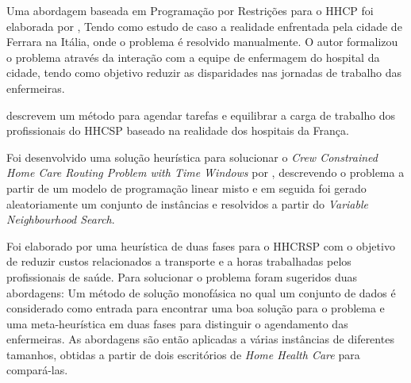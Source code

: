 Uma abordagem baseada em Programação por Restrições para o \ac{HHCP} foi elaborada por \cite{cattafi:2012}, Tendo como estudo de caso a realidade enfrentada pela cidade de Ferrara na Itália, onde o problema é resolvido manualmente. O autor formalizou o problema através da interação com a equipe de enfermagem do hospital da cidade, tendo como objetivo reduzir as disparidades nas jornadas de trabalho das enfermeiras.

\cite{bachouch:2010} descrevem um método para agendar tarefas e equilibrar a carga de trabalho dos profissionais do \ac{HHCSP} baseado na realidade dos hospitais da França. 

Foi desenvolvido uma solução heurística para solucionar o \textit{Crew Constrained Home Care Routing Problem with Time Windows} por \cite{tozlu:2016}, descrevendo o problema a partir de um modelo de programação linear misto e em seguida foi gerado aleatoriamente um conjunto de instâncias e resolvidos a partir do \textit{Variable Neighbourhood Search}. 



Foi elaborado por \cite{Decerle:2016} uma heurística de duas fases para o \ac{HHCRSP} com o objetivo de reduzir custos relacionados a transporte e a horas trabalhadas pelos profissionais de saúde. Para solucionar o problema foram sugeridos duas abordagens: Um método de solução monofásica no qual um conjunto de dados é considerado como entrada para encontrar uma boa solução para o problema e uma meta-heurística em duas fases para distinguir o agendamento das enfermeiras. As abordagens são então aplicadas a várias instâncias de diferentes tamanhos, obtidas a partir de dois escritórios de \textit{Home Health Care} para compará-las.

